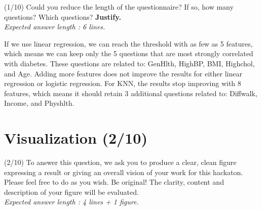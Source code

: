 \documentclass [a4paper, 11pt] {article}
\begin{document}
\begin{question}{2.4}
(1/10) Could you reduce the length of the questionnaire? If so, how many questions? Which questions? \textbf{Justify.}\\
\textit{Expected answer length : 6 lines.}
\end{question}
\begin{answer}\color{blue}
If we use linear regression, we can reach the threshold with as few as 5 features, which means we can keep only the 5 questions 
that are most strongly correlated with diabetes. These questions are related to: GenHlth, HighBP, BMI, Highchol, and Age. 
Adding more features does not improve the results for either linear regression or logistic regression. For KNN, the results 
stop improving with 8 features, which means it should retain 3 additional questions related to: Diffwalk, Income, and Physhlth.
\end{answer}


\section{Visualization (2/10)}

\begin{question}{3.1}
(2/10) To answer this question, we ask you to produce a clear, clean figure expressing a result or giving an overall vision of your work for this hackaton. Please feel free to do as you wish. Be original! The clarity, content and description of your figure will be evaluated.\\
\textit{Expected answer length : 4 lines + 1 figure.}
\end{question}
\begin{answer}\color{blue}
\end{answer}
\pagebreak
\end{document}

